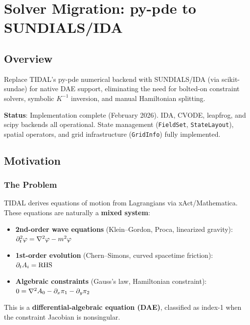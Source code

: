 
\section{Solver Migration: py-pde to SUNDIALS/IDA}
\label{sec:solver-migration}

\subsection{Overview}

Replace TIDAL's py-pde numerical backend with SUNDIALS/IDA (via scikit-sundae)
for native DAE support, eliminating the need for bolted-on constraint solvers,
symbolic $K^{-1}$ inversion, and manual Hamiltonian splitting.

\textbf{Status}: Implementation complete (February 2026). IDA, CVODE, leapfrog, and scipy backends all operational. State management (\texttt{FieldSet}, \texttt{StateLayout}), spatial operators, and grid infrastructure (\texttt{GridInfo}) fully implemented.

\subsection{Motivation}
\label{sec:migration-motivation}

\subsubsection{The Problem}
\label{sec:migration-problem}

TIDAL derives equations of motion from Lagrangians via xAct/Mathematica. These
equations are naturally a \textbf{mixed system}:

\begin{itemize}
  \item \textbf{2nd-order wave equations} (Klein--Gordon, Proca, linearized gravity):
    $\partial_t^2 \varphi = \nabla^2\varphi - m^2\varphi$
  \item \textbf{1st-order evolution} (Chern--Simons, curved spacetime friction):
    $\partial_t A_i = \mathrm{RHS}$
  \item \textbf{Algebraic constraints} (Gauss's law, Hamiltonian constraint):
    $0 = \nabla^2 A_0 - \partial_x \pi_1 - \partial_y \pi_2$
\end{itemize}

This is a \textbf{differential-algebraic equation (DAE)}, classified as index-1 when
the constraint Jacobian is nonsingular.

